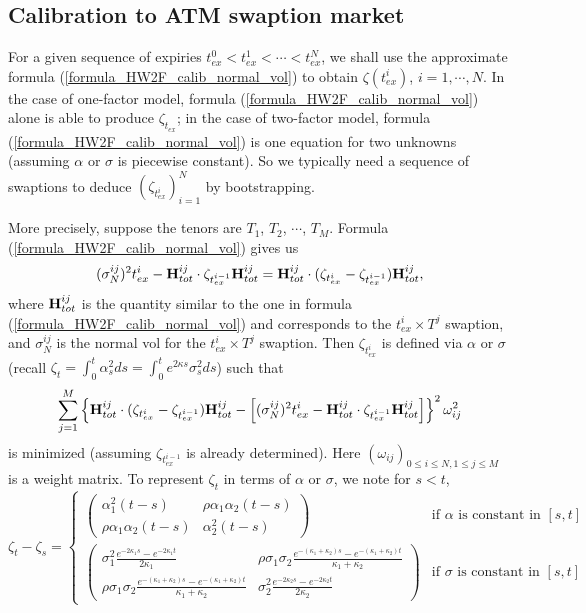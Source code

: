 \documentclass[10pt]{article}
\theoremstyle{plain}
\numberwithin{equation}{section}
\numberwithin{table}{section}
\begin{document}
\subsection{Calibration to ATM swaption market}

For a given sequence of expiries $t_{ex}^0 < t_{ex}^1 < \cdots <
t_{ex}^N$, we shall use the approximate formula
(\ref{formula_HW2F_calib_normal_vol}) to obtain $\zeta(t^i_{ex})$,
$i=1,\cdots, N$. In the case of one-factor model, formula
(\ref{formula_HW2F_calib_normal_vol}) alone is able to produce
$\zeta_{t_{ex}}$; in the case of two-factor model, formula
(\ref{formula_HW2F_calib_normal_vol}) is one equation for two unknowns
(assuming $\alpha$ or $\sigma$ is piecewise constant). So we typically
need a sequence of swaptions to deduce $(\zeta_{t^i_{ex}})_{i=1}^N$ by
bootstrapping.

More precisely, suppose the tenors are $T_1$, $T_2$, $\cdots$, $T_M$.
Formula (\ref{formula_HW2F_calib_normal_vol}) gives us
\[
(\sigma_N^{ij})^2 t^i_{ex} - {\bf H}^{ij}_{tot} \cdot
\zeta_{t^{i-1}_{ex}} {\bf H}^{ij}_{tot} = {\bf H}^{ij}_{tot} \cdot
(\zeta_{t^i_{ex}} - \zeta_{t^{i-1}_{ex}}) {\bf H}^{ij}_{tot},
\]
where ${\bf H}^{ij}_{tot}$ is the quantity similar to the one in
formula (\ref{formula_HW2F_calib_normal_vol}) and corresponds to the
$t_{ex}^i\times T^j$ swaption, and $\sigma_N^{ij}$ is the normal vol
for the $t_{ex}^i \times T^j$ swaption. Then $\zeta_{t^i_{ex}}$ is
defined via $\alpha$ or $\sigma$ (recall $\zeta_t =
\int_0^t\alpha_s^2ds=\int_0^te^{2\kappa s}\sigma_s^2ds$) such that
\[
\sum_{j=1}^M \left\{{\bf H}^{ij}_{tot} \cdot (\zeta_{t^i_{ex}} -
\zeta_{t^{i-1}_{ex}}) {\bf H}^{ij}_{tot} - \left[(\sigma_N^{ij})^2
t^i_{ex} - {\bf H}^{ij}_{tot} \cdot \zeta_{t^{i-1}_{ex}} {\bf
H}^{ij}_{tot}\right]\right\}^2\omega_{ij}^2
\]
is minimized (assuming $\zeta_{t_{ex}^{i-1}}$ is already determined).
Here $(\omega_{ij})_{0\le i \le N, 1\le j \le M}$ is a weight matrix.
To represent $\zeta_t$ in terms of $\alpha$ or $\sigma$, we note for
$s<t$,
\[
\zeta_t - \zeta_s =
\begin{cases}
\left(\begin{matrix} \alpha_1^2(t-s) & \rho \alpha_1\alpha_2(t-s) \\
\rho \alpha_1\alpha_2(t-s) & \alpha_2^2(t-s) \end{matrix} \right)&
\mbox{if $\alpha$ is constant in $[s,t]$} \\
\left(\begin{matrix}
\sigma_1^2\frac{e^{-2\kappa_1s}-e^{-2\kappa_1t}}{2\kappa_1} & \rho
\sigma_1\sigma_2\frac{e^{-(\kappa_1+\kappa_2)s} -
e^{-(\kappa_1+\kappa_2)t}}{\kappa_1+\kappa_2} \\ \rho \sigma_1\sigma_2
\frac{e^{-(\kappa_1+\kappa_2)s} -
e^{-(\kappa_1+\kappa_2)t}}{\kappa_1+\kappa_2} &
\sigma_2^2\frac{e^{-2\kappa_2s}-e^{-2\kappa_2t}}{2\kappa_2}
\end{matrix} \right) & \mbox{if $\sigma$ is constant in $[s,t]$}
\end{cases}
\]
\end{document}
